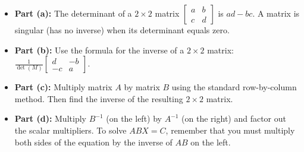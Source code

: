 \begin{hint}
\begin{itemize}
    \item \textbf{Part (a):} The determinant of a $2 \times 2$ matrix $\begin{bmatrix} a & b \\ c & d \end{bmatrix}$ is $ad - bc$. A matrix is singular (has no inverse) when its determinant equals zero.
    \item \textbf{Part (b):} Use the formula for the inverse of a $2 \times 2$ matrix: $\frac{1}{\det(M)} \begin{bmatrix} d & -b \\ -c & a \end{bmatrix}$.
    \item \textbf{Part (c):} Multiply matrix $A$ by matrix $B$ using the standard row-by-column method. Then find the inverse of the resulting $2 \times 2$ matrix.
    \item \textbf{Part (d):} Multiply $B^{-1}$ (on the left) by $A^{-1}$ (on the right) and factor out the scalar multipliers. To solve $ABX = C$, remember that you must multiply both sides of the equation by the inverse of $AB$ on the left.
\end{itemize}
\end{hint}

